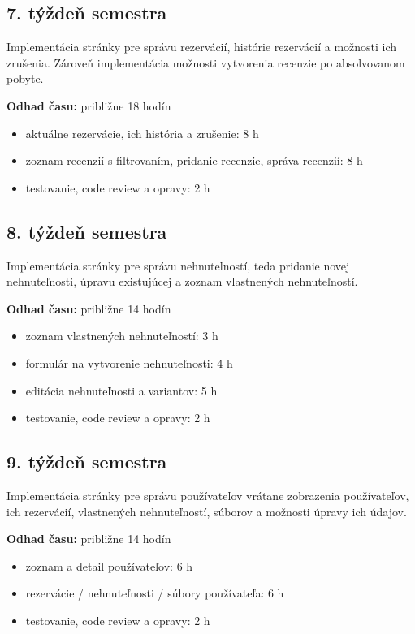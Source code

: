 \subsection*{7. týždeň semestra}
Implementácia stránky pre správu rezervácií, histórie rezervácií a možnosti ich zrušenia. 
Zároveň implementácia možnosti vytvorenia recenzie po absolvovanom pobyte.

\hspace{-1.5em}\textbf{Odhad času:} približne 18 hodín
\begin{itemize}[itemsep=2pt]
    \item aktuálne rezervácie, ich história a zrušenie: 8 h
    \item zoznam recenzií s filtrovaním, pridanie recenzie, správa recenzií: 8 h
    \item testovanie, code review a opravy: 2 h 
\end{itemize}

\subsection*{8. týždeň semestra}
Implementácia stránky pre správu nehnuteľností, teda pridanie novej nehnuteľnosti, úpravu existujúcej a zoznam vlastnených nehnuteľností.

\hspace{-1.5em}\textbf{Odhad času:} približne 14 hodín
\begin{itemize}[itemsep=2pt]
    \item zoznam vlastnených nehnuteľností: 3 h
    \item formulár na vytvorenie nehnuteľnosti: 4 h
    \item editácia nehnuteľnosti a variantov: 5 h
    \item testovanie, code review a opravy: 2 h 
\end{itemize}

\subsection*{9. týždeň semestra}
Implementácia stránky pre správu používateľov vrátane zobrazenia používateľov, ich rezervácií, vlastnených nehnuteľností, súborov a možnosti úpravy ich údajov.

\hspace{-1.5em}\textbf{Odhad času:} približne 14 hodín
\begin{itemize}[itemsep=2pt]
    \item zoznam a detail používateľov: 6 h
    \item rezervácie / nehnuteľnosti / súbory používateľa: 6 h
    \item testovanie, code review a opravy: 2 h 
\end{itemize}

